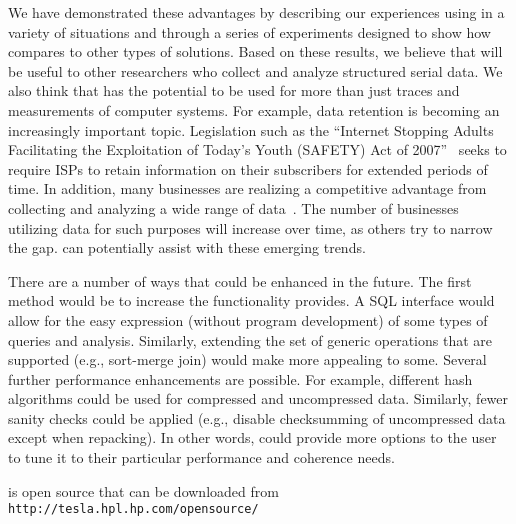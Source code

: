 We have demonstrated these advantages by describing our experiences
using \DataSeries{} in a variety of situations and through a series of
experiments designed to show how \DataSeries{} compares to other types of
solutions. Based on these results,
we believe that \DataSeries{} will be useful to other researchers
who collect and analyze structured serial data.
We also think that \DataSeries{} has the potential to be
used for more than just traces and measurements of computer systems.
For example, data retention is becoming an increasingly important topic.
Legislation such as the ``Internet Stopping Adults Facilitating
the Exploitation of Today's Youth (SAFETY) Act of 2007''~\cite{SAFETY} seeks
to require ISPs to retain information on their subscribers for
extended periods of time.
In addition, many businesses are realizing a competitive advantage from
collecting and analyzing a wide range of data~\cite{HURD}.
The number of businesses utilizing data for such purposes
will increase over time, as others try to narrow the gap.
\DataSeries{} can potentially assist with these emerging trends.

There are a number of ways that \DataSeries{} could be enhanced in the future.
The first method would be to increase the functionality \DataSeries{} provides.
A SQL interface would allow for the easy expression (without
program development) of some types of queries and analysis.
Similarly, extending the set of generic operations that are supported
(e.g., sort-merge join) would make \DataSeries{} more appealing to some.
Several further performance enhancements are possible.
For example, different hash algorithms could be used for compressed
and uncompressed data.  Similarly, fewer sanity checks could be applied
(e.g., disable checksumming of uncompressed data except when repacking).
In other words, \DataSeries{} could provide more options to the user to
tune it to their particular performance and coherence needs.

\DataSeries{} is open source that can be downloaded from {\tt
http://tesla.hpl.hp.com/opensource/}

